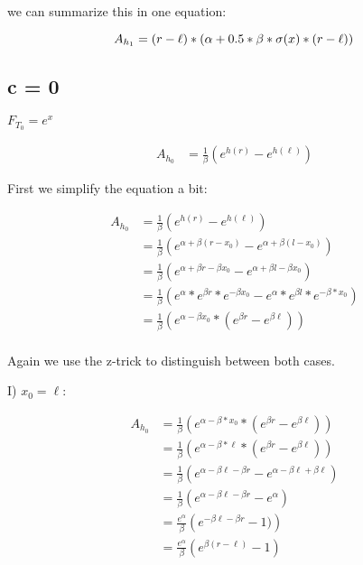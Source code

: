 we can summarize this in one equation:

\[
	A_{h_1} = (r - \ell) * \left( \alpha  + 0.5 * \beta * \sigma(x) * (r - \ell) \right) \\
\]

\subsection{c = 0}

$F_{T_0} = e^x$

\begin{align*}
A_{h_0} &= \frac{1}{\beta} \left( e^{h(r)} - e^{h(\ell)} \right)
\end{align*}

First we simplify the equation a bit:

\begin{align*}
A_{h_0} &= \frac{1}{\beta} \left( e^{h(r)} - e^{h(\ell)} \right) \\
	&= \frac{1}{\beta} \left( e^{\alpha + \beta (r - x_0)} - e^{\alpha + \beta (l - x_0)} \right) \\
	&= \frac{1}{\beta} \left( e^{\alpha + \beta r - \beta x_0} - e^{\alpha + \beta l - \beta x_0} \right) \\
	&= \frac{1}{\beta} \left( e^{\alpha} * e^{\beta r} * e^{-\beta x_0} - e^{\alpha} * e^{\beta l} * e^{- \beta * x_0} \right) \\
	&= \frac{1}{\beta} \left( e^{\alpha - \beta x_0} * \left(e^{\beta r} - e^{\beta \ell} \right) \right) \\
\end{align*}

Again we use the z-trick to distinguish between both cases.


I) $x_0 = \ell$:

\begin{align*}
	A_{h_0} &= \frac{1}{\beta} \left( e^{\alpha - \beta * x_0} * \left(e^{\beta r} - e^{\beta \ell} \right) \right) \\
	&= \frac{1}{\beta} \left( e^{\alpha - \beta * \ell} * \left(e^{\beta r} - e^{\beta \ell} \right) \right) \\
	&= \frac{1}{\beta} \left(e^{\alpha - \beta \ell - \beta r} - e^{\alpha - \beta \ell + \beta \ell} \right) \\
	&= \frac{1}{\beta} \left(e^{\alpha - \beta \ell - \beta r} - e^{\alpha} \right) \\
	&= \frac{e^{\alpha}}{\beta} \left(e^{- \beta \ell - \beta r} - 1) \right) \\
	&= \frac{e^{\alpha}}{\beta} \left(e^{\beta (r - \ell)} - 1 \right) \\
\end{align*}

